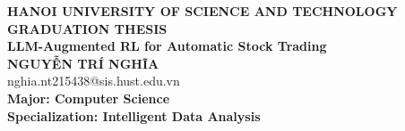 \begin{titlepage}
  \thispagestyle{empty}
  \begin{center}

    {\textbf{\large{HANOI UNIVERSITY OF SCIENCE AND TECHNOLOGY}}}\\[4cm]

    {\textbf{\huge{ GRADUATION THESIS}}}\\[1cm]
    {\textbf{\Large{LLM-Augmented RL for Automatic Stock Trading}}}\\[1cm]

    {\textbf{\large{NGUYỄN TRÍ NGHĨA}}}\\
    {\large{nghia.nt215438@sis.hust.edu.vn}}\\[0.5cm]

    {\textbf{\large{Major: Computer Science}}}\\
    {\textbf{\large{Specialization: Intelligent Data Analysis}}}\\

    \vspace{2cm}

    \begin{table}[H]
      \centering
      \large
    \end{table}
  \end{center}
\end{titlepage}
